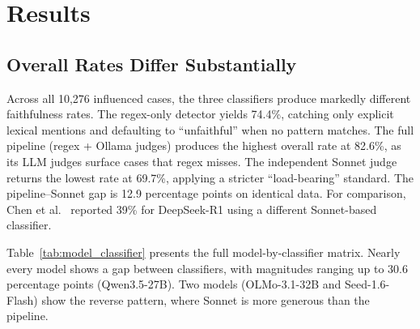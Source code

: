 \section{Results}

\subsection{Overall Rates Differ Substantially}

Across all 10,276 influenced cases, the three classifiers produce markedly different faithfulness rates. The regex-only detector yields 74.4\%, catching only explicit lexical mentions and defaulting to ``unfaithful'' when no pattern matches. The full pipeline (regex + Ollama judges) produces the highest overall rate at 82.6\%, as its LLM judges surface cases that regex misses. The independent Sonnet judge returns the lowest rate at 69.7\%, applying a stricter ``load-bearing'' standard. The pipeline--Sonnet gap is 12.9 percentage points on identical data. For comparison, Chen et al.~\cite{chen2025reasoning} reported 39\% for DeepSeek-R1 using a different Sonnet-based classifier.

Table~\ref{tab:model_classifier} presents the full model-by-classifier matrix. Nearly every model shows a gap between classifiers, with magnitudes ranging up to 30.6 percentage points (Qwen3.5-27B). Two models (OLMo-3.1-32B and Seed-1.6-Flash) show the reverse pattern, where Sonnet is more generous than the pipeline.

